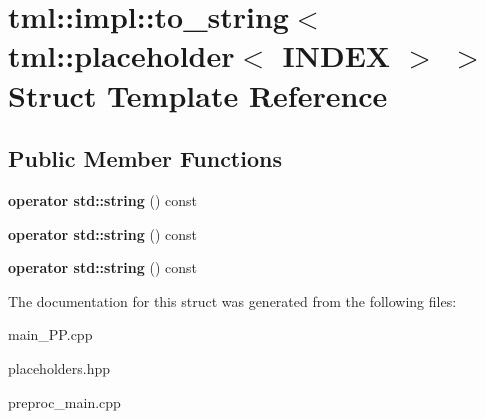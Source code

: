 \hypertarget{structtml_1_1impl_1_1to__string_3_01tml_1_1placeholder_3_01INDEX_01_4_01_4}{\section{tml\+:\+:impl\+:\+:to\+\_\+string$<$ tml\+:\+:placeholder$<$ I\+N\+D\+E\+X $>$ $>$ Struct Template Reference}
\label{structtml_1_1impl_1_1to__string_3_01tml_1_1placeholder_3_01INDEX_01_4_01_4}
}
\subsection*{Public Member Functions}
\begin{DoxyCompactItemize}
\item 
\hypertarget{structtml_1_1impl_1_1to__string_3_01tml_1_1placeholder_3_01INDEX_01_4_01_4_aa2910105bc1d91762c93fc60c6012144}{{\bfseries operator std\+::string} () const }\label{structtml_1_1impl_1_1to__string_3_01tml_1_1placeholder_3_01INDEX_01_4_01_4_aa2910105bc1d91762c93fc60c6012144}

\item 
\hypertarget{structtml_1_1impl_1_1to__string_3_01tml_1_1placeholder_3_01INDEX_01_4_01_4_aa2910105bc1d91762c93fc60c6012144}{{\bfseries operator std\+::string} () const }\label{structtml_1_1impl_1_1to__string_3_01tml_1_1placeholder_3_01INDEX_01_4_01_4_aa2910105bc1d91762c93fc60c6012144}

\item 
\hypertarget{structtml_1_1impl_1_1to__string_3_01tml_1_1placeholder_3_01INDEX_01_4_01_4_aa2910105bc1d91762c93fc60c6012144}{{\bfseries operator std\+::string} () const }\label{structtml_1_1impl_1_1to__string_3_01tml_1_1placeholder_3_01INDEX_01_4_01_4_aa2910105bc1d91762c93fc60c6012144}

\end{DoxyCompactItemize}


The documentation for this struct was generated from the following files\+:\begin{DoxyCompactItemize}
\item 
main\+\_\+\+P\+P.\+cpp\item 
placeholders.\+hpp\item 
preproc\+\_\+main.\+cpp\end{DoxyCompactItemize}
